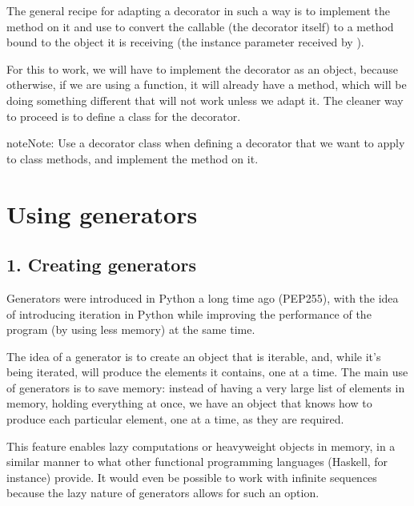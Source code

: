 \documentclass[a4paper,10pt,english]{sphinxmanual}
\begin{document}
The general recipe for adapting a decorator in such a way is to implement the 
method on it and use  to convert the callable (the decorator itself) to a
method bound to the object it is receiving (the instance parameter received by ).

For this to work, we will have to implement the decorator as an object, because otherwise, if
we are using a function, it will already have a  method, which will be doing
something different that will not work unless we adapt it. The cleaner way to proceed is to
define a class for the decorator.

\begin{sphinxadmonition}{note}{Note:}
Use a decorator class when defining a decorator that we want to apply to class methods, and implement the  method on it.
\end{sphinxadmonition}


\chapter{Using generators}
\label{\detokenize{chapters/7_generators/index:using-generators}}\label{\detokenize{chapters/7_generators/index::doc}}

\section{1. Creating generators}
\label{\detokenize{chapters/7_generators/index:creating-generators}}
Generators were introduced in Python a long time ago (PEP\sphinxhyphen{}255), with the idea of
introducing iteration in Python while improving the performance of the program (by using
less memory) at the same time.

The idea of a generator is to create an object that is iterable, and, while it’s being iterated,
will produce the elements it contains, one at a time. The main use of generators is to save
memory: instead of having a very large list of elements in memory, holding everything at
once, we have an object that knows how to produce each particular element, one at a time,
as they are required.

This feature enables lazy computations or heavyweight objects in memory, in a similar
manner to what other functional programming languages (Haskell, for instance) provide. It
would even be possible to work with infinite sequences because the lazy nature of
generators allows for such an option.
\end{document}
